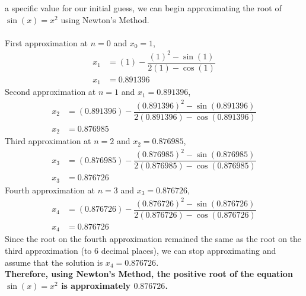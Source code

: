 \documentclass[12pt]{book}
\begin{document}
\begin{enumerate}
a specific value for our initial guess, we can begin approximating the root of $\sin(x)=x^2$ using Newton's Method.\\\\
\newpage    %
First approximation at $n=0$ and $x_0 = 1$,
\begin{align}
    x_{1} &= (1) - \dfrac{(1)^2-\sin(1)}{2(1) - \cos(1)} \\
    x_{1} &= 0.891396
\end{align}
Second approximation at $n=1$ and $x_1 = 0.891396$,
\begin{align}
    x_{2} &= (0.891396) - \dfrac{(0.891396)^2-\sin(0.891396)}{2(0.891396) - \cos(0.891396)} \\
    x_{2} &= 0.876985
\end{align}
Third approximation at $n=2$ and $x_2 = 0.876985$,
\begin{align}
    x_{3} &= (0.876985) - \dfrac{(0.876985)^2-\sin(0.876985)}{2(0.876985) - \cos(0.876985)} \\
    x_{3} &= 0.876726
\end{align}
Fourth approximation at $n=3$ and $x_3 = 0.876726$,
\begin{align}
    x_{4} &= (0.876726) - \dfrac{(0.876726)^2-\sin(0.876726)}{2(0.876726) - \cos(0.876726)} \\
    x_{4} &= 0.876726
\end{align}
Since the root on the fourth approximation remained the same as the root on the third approximation (to 6 decimal places), we can stop approximating and assume that the solution is $x_{4} = 0.876726$.\\

\textbf{Therefore, using Newton's Method, the positive root of the equation $\sin(x)=x^2$ is approximately $0.876726$.}




\end{enumerate}
\end{document}
